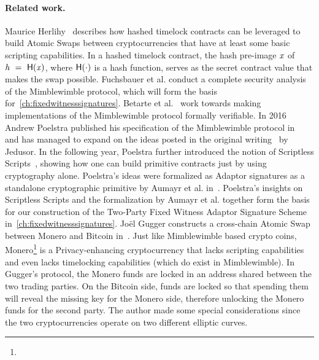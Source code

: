 \paragraph{Related work.} Maurice Herlihy~\cite{herlihy2018atomic} describes how hashed timelock contracts can be leveraged to build Atomic Swaps between cryptocurrencies that have at least some basic scripting capabilities.
In a hashed timelock contract, the hash pre-image $\mathit{x}$ of $\mathit{h} ~=~ \mathsf{H} (\mathit{x})$, where $\mathsf{H} (\cdot)$ is a hash function, serves as the secret contract value that makes the swap possible.
Fuchsbauer et al. conduct a complete security analysis of the Mimblewimble protocol, which will form the basis for~\cref{ch:fixedwitnesssignatures}.
Betarte et al.~\cite{betarte2019towards} work towards making implementations of the Mimblewimble protocol formally verifiable.
In 2016 Andrew Poelstra published his specification of the Mimblewimble protocol in~\cite{poelstra2016mimblewimble} and has managed to expand on the ideas posted in the original writing~\cite{jedusor2016mimblewimble} by Jedusor.
In the following year, Poelstra further introduced the notion of Scriptless Scripts~\cite{poelstra2017scriptless}, showing how one can build primitive contracts just by using cryptography alone.
Poelstra's ideas were formalized as Adaptor signatures as a standalone cryptographic primitive by Aumayr et al. in~\cite{aumayr2020bitcoinchannels}.
Poelstra's insights on Scriptless Scripts and the formalization by Aumayr et al. together form the basis for our construction of the Two-Party Fixed Witness Adaptor Signature Scheme in~\cref{ch:fixedwitnesssignatures}.
Joël Gugger constructs a cross-chain Atomic Swap between Monero and Bitcoin in~\cite{gugger2020bitcoin}.
Just like Mimblewimble based crypto coins, Monero\footnote{\urlmonero} is a Privacy-enhancing cryptocurrency that lacks scripting capabilities and even lacks timelocking capabilities (which do exist in Mimblewimble).
In Gugger's protocol, the Monero funds are locked in an address shared between the two trading parties.
On the Bitcoin side, funds are locked so that spending them will reveal the missing key for the Monero side, therefore unlocking the Monero funds for the second party.
The author made some special considerations since the two cryptocurrencies operate on two different elliptic curves.

